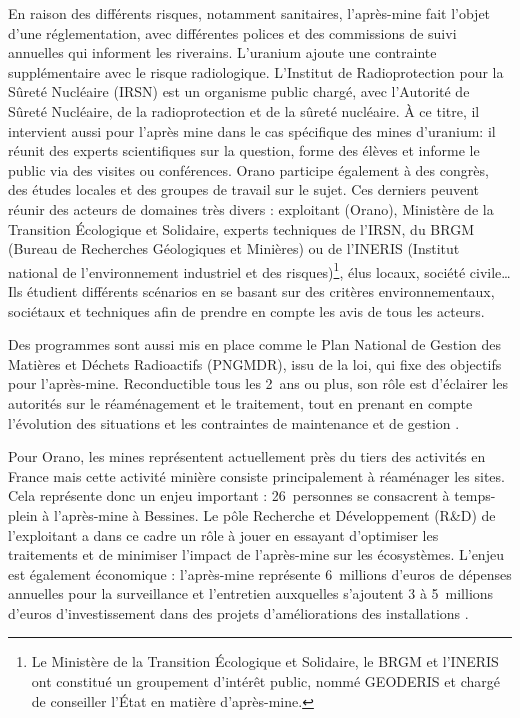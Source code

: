 \documentclass{article}
\begin{document}
En raison des différents risques, notamment sanitaires, l’après-mine fait l’objet d’une réglementation, avec différentes polices et des commissions de suivi annuelles qui informent les riverains.
L'uranium ajoute une contrainte supplémentaire avec le risque radiologique. L’Institut de Radioprotection pour la Sûreté Nucléaire (IRSN) est un organisme public chargé, avec l'Autorité de Sûreté Nucléaire, de la radioprotection et de la sûreté nucléaire. \`A ce titre, il intervient aussi pour l'après mine dans le cas spécifique des mines d'uranium: il réunit des experts scientifiques sur la question, forme des élèves et informe le public via des visites ou conférences. Orano participe également à des congrès, des études locales et des groupes de travail sur le sujet. Ces derniers peuvent réunir des acteurs de domaines très divers : exploitant (Orano), Ministère de la Transition Écologique et Solidaire, experts techniques de l’IRSN, du BRGM (Bureau de Recherches Géologiques et Minières) ou de l'INERIS (Institut national de l'environnement industriel et des risques)\footnote{Le Ministère de la Transition Écologique et Solidaire, le BRGM et l'INERIS ont constitué un groupement d'intérêt public, nommé GEODERIS et chargé de conseiller l'État en matière d'après-mine.}, élus locaux, société civile… Ils étudient différents scénarios en se basant sur des critères environnementaux, sociétaux et techniques afin de prendre en compte les avis de tous les acteurs.

Des programmes sont aussi mis en place comme le Plan National de Gestion des Matières et Déchets Radioactifs (PNGMDR), issu de la loi, qui fixe des objectifs pour l’après-mine. Reconductible tous les 2~ans ou plus, son rôle est d’éclairer les autorités sur le réaménagement et le traitement, tout en prenant en compte l’évolution des situations et les contraintes de maintenance et de gestion \cite{dublineau_gestion_2020}.

Pour Orano, les mines représentent actuellement près du tiers des activités en France mais cette activité minière consiste principalement à réaménager les sites. Cela représente donc un enjeu important : 26~personnes se consacrent à temps-plein à l'après-mine à Bessines. Le pôle Recherche et Développement (R\&D) de l’exploitant a dans ce cadre un rôle à jouer en essayant d’optimiser les traitements et de minimiser l’impact de l’après-mine sur les écosystèmes. L'enjeu est également économique : l’après-mine représente 6~millions d’euros de dépenses annuelles pour la surveillance et l’entretien auxquelles s’ajoutent 3 à 5~millions d’euros d’investissement dans des projets d’améliorations des installations \cite{himeur_apres-mine_2020}.
\end{document}
